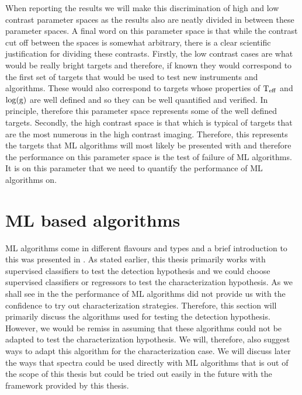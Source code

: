 When reporting the results we will make this discrimination of high and low contrast parameter spaces as the results also are neatly divided in between these parameter spaces.
A final word on this parameter space is that while the contrast cut off between the spaces is somewhat arbitrary, there is a clear scientific justification for dividing these contrasts.
Firstly, the low contrast cases are what would be really bright targets and therefore, if known they would correspond to the first set of targets that would be used to test new instruments and algorithms.
These would also correspond to targets whose properties of $\rm{T_{eff}}$ and $\rm{\log(g)}$ are well defined and so they can be well quantified and verified.
In principle, therefore this parameter space represents some of the well defined targets.
Secondly, the high contrast space is that which is typical of targets that are the most numerous in the high contrast imaging.
Therefore, this represents the targets that ML algorithms will most likely be presented with and therefore the performance on this parameter space is the test of failure of ML algorithms. 
It is on this parameter that we need to quantify the performance of ML algorithms on.
\section{ML based algorithms}
ML algorithms come in different flavours and types and a brief introduction to this was presented in .
As stated earlier, this thesis primarily works with supervised classifiers to test the detection hypothesis and we could choose supervised classifiers or regressors to test the characterization hypothesis.
As we shall see in the   the performance of ML algorithms did not provide us with the confidence to try out characterization strategies.
Therefore, this section will primarily discuss the algorithms used for testing the detection hypothesis.
However, we would be remiss in assuming that these algorithms could not be adapted to test the characterization hypothesis.
We will, therefore, also suggest ways to adapt this algorithm for the characterization case.
We will discuss later the ways that spectra could be used directly with ML algorithms that is out of the scope of this thesis but could be tried out easily in the future with the framework provided by this thesis.

